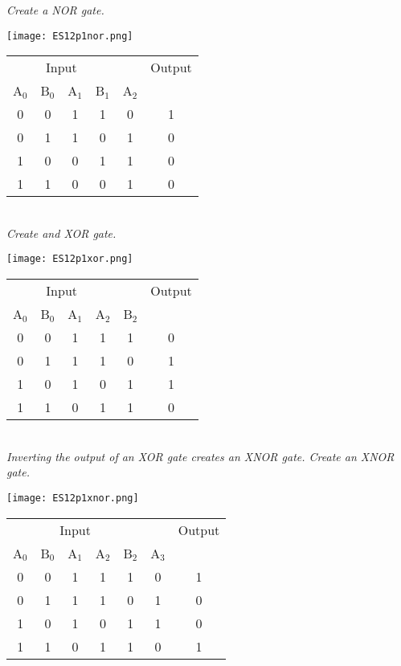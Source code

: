 \documentclass[a4paper,man,natbib]{apa6}
\begin{document}
\emph{Create a NOR gate.} \\
	\begin{minipage}{2.5in}
		\texttt{[image: ES12p1nor.png]}
	\end{minipage}
	\begin{minipage}{2.5in}
		\begin{tabular}{ c c | c c c | c }
			\multicolumn{4}{c}{Input} & & Output \\
			A$_{0}$ & B$_{0}$ & A$_{1}$ & B$_{1}$ & A$_{2}$ & \\
			\hline
			0 & 0 & 1 & 1 & 0 & 1 \\
			0 & 1 & 1 & 0 & 1 & 0 \\
			1 & 0 & 0 & 1 & 1 & 0 \\
			1 & 1 & 0 & 0 & 1 & 0 \\
		\end{tabular}
	\end{minipage} ~\\
\emph{Create and XOR gate.} \\
	\begin{minipage}{2.5in}
		\texttt{[image: ES12p1xor.png]}
	\end{minipage}
	\begin{minipage}{2.5in}
		\begin{tabular}{ c c | c c c | c }
			\multicolumn{4}{c}{Input} & & Output \\
			A$_{0}$ & B$_{0}$ & A$_{1}$ & A$_{2}$ & B$_{2}$ & \\
			\hline
			0 & 0 & 1 & 1 & 1 & 0 \\
			0 & 1 & 1 & 1 & 0 & 1 \\
			1 & 0 & 1 & 0 & 1 & 1 \\
			1 & 1 & 0 & 1 & 1 & 0 \\
		\end{tabular}
	\end{minipage} ~\\
\emph{Inverting the output of an XOR gate creates an XNOR gate.  Create an XNOR gate.} \\
	\begin{minipage}{2.5in}
		\texttt{[image: ES12p1xnor.png]}
	\end{minipage}
	\begin{minipage}{2.5in}
		\begin{tabular}{ c c | c c c c | c }
			\multicolumn{5}{c}{Input} & & Output \\
			A$_{0}$ & B$_{0}$ & A$_{1}$ & A$_{2}$ & B$_{2}$ & A$_{3}$ & \\
			\hline
			0 & 0 & 1 & 1 & 1 & 0 & 1 \\
			0 & 1 & 1 & 1 & 0 & 1 & 0 \\
			1 & 0 & 1 & 0 & 1 & 1 & 0 \\
			1 & 1 & 0 & 1 & 1 & 0 & 1 \\
		\end{tabular}
	\end{minipage} ~\\
\end{document}
